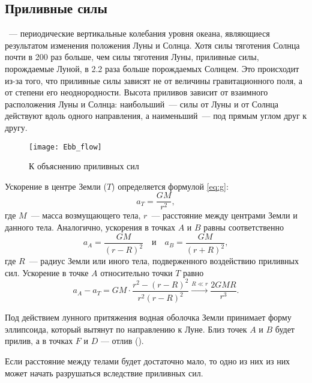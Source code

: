 \subsection{Приливные силы}

~--- периодические вертикальные колебания уровня океана, являющиеся результатом изменения положения Луны и Солнца. Хотя силы тяготения Солнца почти в 200 раз больше, чем силы тяготения Луны, приливные силы, порождаемые Луной, в 2.2 раза больше порождаемых Солнцем. Это происходит из-за того, что приливные силы зависят не от величины гравитационного поля, а от степени его неоднородности. Высота приливов зависит от взаимного расположения Луны и Солнца: наибольший~---  силы от Луны и от Солнца действуют вдоль одного направления, а наименьший~--- под прямым углом друг к другу.

\begin{wrapfigure}[11]{r}{0.74\tw}
    \vspace{-.5pc}
    \texttt{[image: Ebb\_flow]}
    \caption{К объяснению приливных сил}\label{Ebb_flow}
\end{wrapfigure}
Ускорение в центре Земли ($T$) определяется формулой \eqref{eq:g}:
\begin{equation*}
    a_T=\frac{G M}{r^2},
\end{equation*}
где $M$~--- масса возмущающего тела, $r$~--- расстояние между центрами Земли и данного тела. Аналогично, ускорения в точках $A$ и $B$ равны соответственно
\begin{equation}
    a_A = \frac{G M}{(r - R)^2} \quad \text{и} \quad a_B = \frac{GM}{(r + R)^2},
\end{equation}
где $R$~--- радиус Земли или иного тела, подверженного воздействию приливных сил. Ускорение в точке $A$ относительно точки $T$ равно
\begin{equation}
    a_A - a_T = GM \cdot \frac{r^2 - (r - R)^2}{r^2 (r - R)^2} \xrightarrow{R \ll r} \frac{2 G M R}{r^3}.
    \label{eq:ebb-force}
\end{equation}

Под действием лунного притяжения водная оболочка Земли принимает форму
эллипсоида, который вытянут по направлению к Луне. Близ точек $A$ и $B$ будет
прилив, а в точках $F$ и $D$ --- отлив ().

Если расстояние между телами будет достаточно мало, то одно из них из них может начать разрушаться вследствие приливных сил.

